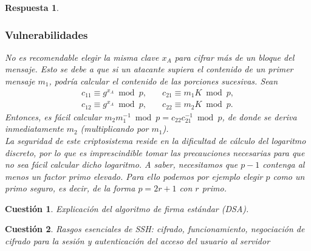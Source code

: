 \documentclass[
  a4paper,
  spanish,
  12pt,
]{scrartcl}
\theoremstyle{ejercicio-style}
\newtheorem{ejer}{Cuestión}
\theoremstyle{remark-style}
\newtheorem*{sol}{Respuesta}
\theoremstyle{teorema-style}
\begin{document}
\begin{sol}
\subsubsection*{Vulnerabilidades}

No es recomendable elegir la misma clave $x_A$ para cifrar más de un bloque del mensaje. Esto se debe a que si un atacante supiera el contenido de un primer mensaje \(m_{1}\), podría calcular el contenido de las porciones sucesivas. Sean
\begin{align*}
c_{11}\equiv g^{x_{A}} \bmod{p}, \quad& c_{21}\equiv m_{1}K\bmod{p}, \\
c_{12}\equiv g^{x_{A}} \bmod{p}, \quad& c_{22}\equiv m_{2}K\bmod{p}.
\end{align*}
Entonces, es fácil calcular \(m_2m_1^{-1} \bmod p = c_{22}c_{21}^{-1} \bmod{p}\), de donde se deriva inmediatamente \(m_{2}\) (multiplicando por \(m_{1}\)).  \\

La seguridad de este criptosistema reside en la dificultad de cálculo del logaritmo discreto, por lo que es imprescindible tomar las precauciones necesarias para que no sea fácil calcular dicho logaritmo. A saber, necesitamos que $p-1$ contenga al menos un factor primo elevado. Para ello podemos por ejemplo elegir $p$ como un \textit{primo seguro}, es decir, de la forma $p = 2r + 1$ con $r$ primo.
\end{sol}

\begin{ejer}
  Explicación del algoritmo de firma estándar (DSA).
\end{ejer}

\begin{ejer}
  Rasgos esenciales de SSH: cifrado, funcionamiento, negociación de cifrado para la sesión y autenticación del acceso del usuario al servidor
\end{ejer}
\end{document}
